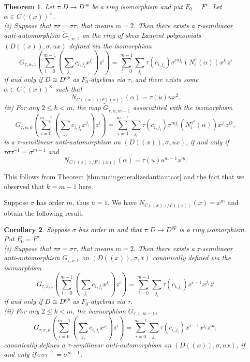 \documentclass{amsart}
\theoremstyle{plain}
\newtheorem{theorem}{Theorem}[section]
\newtheorem{corollary}[theorem]{Corollary}
\theoremstyle{definition}
\numberwithin{equation}{section}
\numberwithin{figure}{section}
\begin{document}
\begin{theorem}\label{thm:maingeneralizedantiaut6}
Let $\tau:D\to D^{op}$ be a ring isomorphism and put $F_0=F^\tau$. Let  $\alpha\in C((x))^\times$.
\\ (i) Suppose that $\tau\sigma=\sigma\tau$, that means $m=2$. Then there exists a $\tau$-semilinear anti-automorphism $\widetilde G_{\tilde\tau,\alpha,1}$ on  the ring of skew Laurent polynomials  $(D((x)),\sigma, ux)$ defined via the isomorphism
$$ G_{\tau,\alpha,1} ( \sum_{i=0}^{m-1}(\sum_{j_i}c_{i,{j_i}} x^{j_i}) z^i ) =\sum_{i=0}^{m-1}\sum_{j_i}\tau(c_{i,{j_i}}) \sigma^{m{j_i}}( N_i^{\sigma}(\alpha)) x^{j_i}  z^{i}$$
 if and only if $D\cong D^{op} $ as $F_0$-algebras via $\tau$, and there exists  some $\alpha\in C((x))^\times$ such that
$$N_{C((x))/F((x))}(\alpha)= \tau(u) ux^2.$$
 (ii) For any $2\leq k < m$, the map
$\widetilde  G_{\tilde\tau,\alpha,m-1}$ associatited with the isomorphism
$$G_{\tau,\alpha,k} ( \sum_{i=0}^{m-1}(\sum_{j_i}c_{i,{j_i}} x^{j_i}) z^i ) =\sum_{i=0}^{m-1}\sum_{j_i}\tau(c_{i,{j_i}}) \sigma^{m{j_i}}( N_i^{\sigma^k}(\alpha)) x^{j_i}  z^{ik},$$
 is a $\tau$-semilinear anti-automorphism on  $(D((x)),\sigma, ux)$, if and only if
 $ \tau\sigma \tau^{-1}=\sigma^{m-1}$ and
  $$N_{C((x))/F((x))}(\alpha)=\tau(u)u^{m-1} x^m.$$
\end{theorem}

This follows from Theorem \ref{thm:maingeneralizedantiautcor} and the fact that we observed that $k=m-1$ here.

Suppose $\sigma$ has order $m$, thus $u=1$. We have  $N_{C((x))/F((x))}(x)= x^m$ and obtain the following result.



\begin{corollary} \label{cor:maingeneralizedantiaut6}
Suppose $\sigma$ has order $m$ and that $\tau:D\to D^{op}$ is a ring isomorphism. Put $F_0=F^\tau$.
\\ (i) Suppose that $\tau\sigma=\sigma\tau$, that means $m=2$. Then there exists a $\tau$-semilinear anti-automorphism $ G_{\tau,x,1}$ on $(D((x)),\sigma, x)$ canonically defined via the isomorphism
$$ G_{\tau,x,1} ( \sum_{i=0}^{m-1}(\sum_{j_i}c_{i,{j_i}} x^{j_i}) z^i ) =\sum_{i=0}^{m-1}\sum_{j_i}\tau(c_{i,{j_i}})  x^{i-1} x^{j_i}  z^{i}$$
 if and only if $D\cong D^{op} $ as $F_0$-algebras via $\tau$.
 \\ (ii) For any $2\leq k < m$, the isomorphism
$ G_{\tau,x,m-1}$,
$$ G_{\tau,x,k} ( \sum_{i=0}^{m-1}(\sum_{j_i}c_{i,{j_i}} x^{j_i}) z^i ) =\sum_{i=0}^{m-1}\sum_{j_i}\tau(c_{i,{j_i}}) x^{i-1} x^{j_i} z^{ik},$$
 canonically defines a $\tau$-semilinear anti-automorphism on  $(D((x)),\sigma, ux)$, if and only if
 $ \tau\sigma \tau^{-1}=\sigma^{m-1}$.
\end{corollary}
\end{document}
